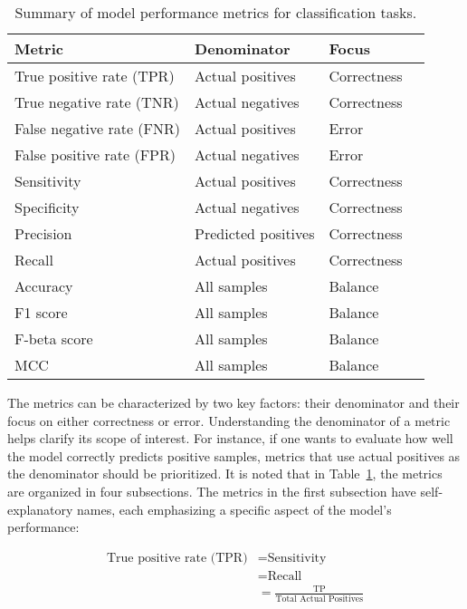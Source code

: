 \begin{table}[H]
    \caption{Summary of model performance metrics for classification tasks.}
    \centering
    \begin{tabular}{llll}
        \toprule
        Metric & Denominator & Focus \\
        \midrule
        True positive rate (TPR) & Actual positives & Correctness \\
        True negative rate (TNR) & Actual negatives & Correctness \\
        False negative rate (FNR) & Actual positives & Error \\
        False positive rate (FPR) & Actual negatives & Error \\
        \midrule
        Sensitivity & Actual positives & Correctness \\
        Specificity & Actual negatives & Correctness \\
        \midrule
        Precision & Predicted positives & Correctness \\
        Recall & Actual positives & Correctness \\
        \midrule
        Accuracy & All samples & Balance \\
        F1 score & All samples & Balance \\
        F-beta score & All samples & Balance \\
        MCC & All samples & Balance \\
        \bottomrule
    \end{tabular}
    \label{tab:metrics-cls}
\end{table}

The metrics can be characterized by two key factors: their denominator and their focus on either correctness or error. Understanding the denominator of a metric helps clarify its scope of interest. For instance, if one wants to evaluate how well the model correctly predicts positive samples, metrics that use actual positives as the denominator should be prioritized.
It is noted that in Table~\ref{tab:metrics-cls}, the metrics are organized in four subsections. The metrics in the first subsection have self-explanatory names, each emphasizing a specific aspect of the model’s performance:


\begin{equation} \label{eq_TPR}
    \begin{split}
    \text{True positive rate (TPR)} &= \text{Sensitivity}\\
                    &= \text{Recall}\\
                    &= \frac{\text{TP}}{\text{Total Actual Positives}}\\
    \end{split}
\end{equation}


